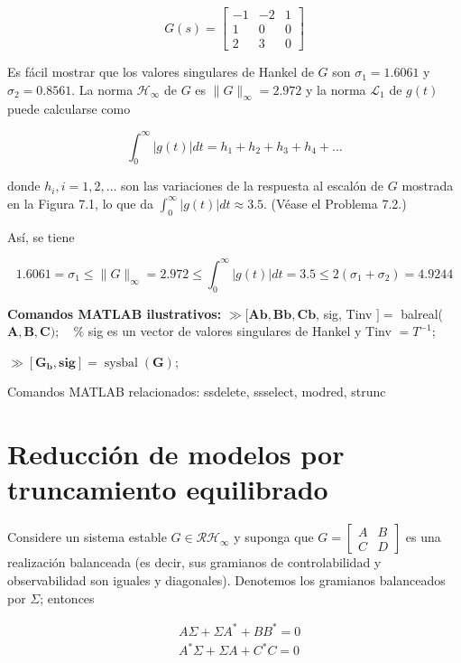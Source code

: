 $$
G(s)=\left[\begin{array}{cc|c}
-1 & -2 & 1 \\
1 & 0 & 0 \\
\hline 2 & 3 & 0
\end{array}\right]
$$

Es fácil mostrar que los valores singulares de Hankel de $G$ son $\sigma_{1}=1.6061$ y $\sigma_{2}=0.8561$. La norma $\mathcal{H}_{\infty}$ de $G$ es $\|G\|_{\infty}=2.972$ y la norma $\mathcal{L}_{1}$ de $g(t)$ puede calcularse como

$$
\int_{0}^{\infty}|g(t)| d t=h_{1}+h_{2}+h_{3}+h_{4}+\ldots
$$

donde $h_{i}, i=1,2, \ldots$ son las variaciones de la respuesta al escalón de $G$ mostrada en la Figura 7.1, lo que da $\int_{0}^{\infty}|g(t)| d t \approx 3.5$. (Véase el Problema 7.2.)


Así, se tiene

$$
1.6061=\sigma_{1} \leq\|G\|_{\infty}=2.972 \leq \int_{0}^{\infty}|g(t)| d t=3.5 \leq 2\left(\sigma_{1}+\sigma_{2}\right)=4.9244
$$

\textbf{Comandos MATLAB ilustrativos:}
$\gg[\mathbf{A b}, \mathbf{B b}, \mathbf{C b}$, sig, Tinv $]=$ balreal( $\mathbf{A}, \mathbf{B}, \mathbf{C}) ; \quad \%$ sig es un vector de valores singulares de Hankel y Tinv $=T^{-1}$;

$\gg\left[\mathbf{G}_{\mathbf{b}}, \mathbf{s i g}\right]=\operatorname{sysbal}(\mathbf{G})$;

Comandos MATLAB relacionados: ssdelete, ssselect, modred, strunc

\section{Reducción de modelos por truncamiento equilibrado}
Considere un sistema estable $G \in \mathcal{R} \mathcal{H}_{\infty}$ y suponga que $G=\left[\begin{array}{c|c}A & B \\ \hline C & D\end{array}\right]$ es una realización balanceada (es decir, sus gramianos de controlabilidad y observabilidad son iguales y diagonales). Denotemos los gramianos balanceados por $\Sigma$; entonces


\begin{align*}
& A \Sigma+\Sigma A^{*}+B B^{*}=0  \tag{7.5}\\
& A^{*} \Sigma+\Sigma A+C^{*} C=0 \tag{7.6}
\end{align*}


